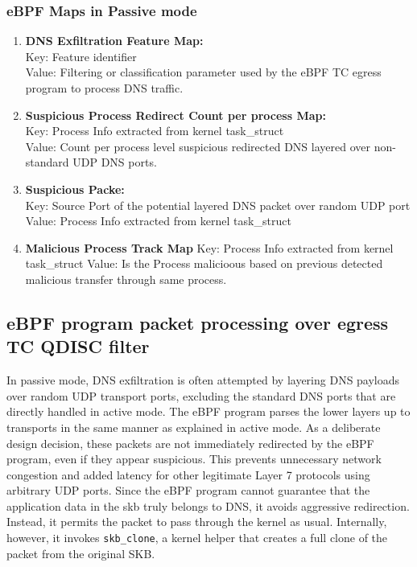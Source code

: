 \documentclass [11pt, proquest] {uwthesis}[2020/02/24]
\begin{document}
\subsubsection{\textbf{eBPF Maps in Passive mode}}
\begin{enumerate}[itemsep=1pt,parsep=0pt]
\label{passive:maps}
\item \textbf{DNS Exfiltration Feature Map:} \\
Key: Feature identifier \\
Value: Filtering or classification parameter used by the eBPF TC egress program to process DNS traffic.

\item \textbf{Suspicious Process Redirect Count per process Map:} \\
Key: Process Info extracted from kernel task\_struct \\
Value: Count per process level suspicious redirected DNS layered over non-standard UDP DNS ports.

\item \textbf{Suspicious Packe:} \\
Key: Source Port of the potential layered DNS packet over random UDP port \\
Value: Process Info extracted from kernel task\_struct 


\item \textbf{Malicious Process Track Map}
Key: Process Info extracted from kernel task\_struct
Value: Is the Process malicioous based on previous detected malicious transfer through same process.
\end{enumerate}





\subsection{\textbf{eBPF program packet processing over egress TC QDISC filter}}
\label{passive:sec1}
In passive mode, DNS exfiltration is often attempted by layering DNS payloads over random UDP transport ports, excluding the standard DNS ports that are directly handled in active mode. The eBPF program parses the lower layers up to transports in the same manner as explained in active mode. As a deliberate design decision, these packets are not immediately redirected by the eBPF program, even if they appear suspicious. This prevents unnecessary network congestion and added latency for other legitimate Layer 7 protocols using arbitrary UDP ports. Since the eBPF program cannot guarantee that the application data in the skb truly belongs to DNS, it avoids aggressive redirection. Instead, it permits the packet to pass through the kernel as usual. Internally, however, it invokes \texttt{skb\_clone}, a kernel helper that creates a full clone of the packet from the original SKB.
\end{document}

